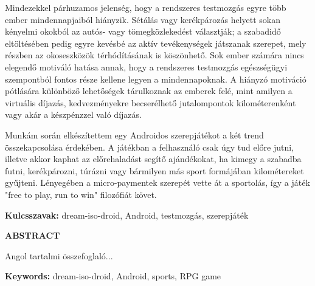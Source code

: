 \documentclass[a4paper,oneside,10pt]{report}
\begin{document}
Mindezekkel párhuzamos jelenség, hogy a rendszeres testmozgás egyre több ember mindennapjaiból hiányzik.
Sétálás vagy kerékpározás helyett sokan kényelmi okokból az autós- vagy tömegközlekedést választják; a szabadidő eltöltésében pedig egyre kevésbé az aktív tevékenységek játszanak szerepet, mely részben az okoseszközök térhódításának is köszönhető.
Sok ember számára nincs elegendő motiváló hatása annak, hogy a rendszeres testmozgás egészségügyi szempontból fontos része kellene legyen a mindennapoknak. 
A hiányzó motiváció pótlására különböző lehetőségek tárulkoznak az emberek felé, mint amilyen a virtuális díjazás, kedvezményekre becserélhető jutalompontok kilométerenként vagy akár a készpénzzel való díjazás. 

Munkám során elkészítettem egy Androidos szerepjátékot a két trend összekapcsolása érdekében. 
A játékban a felhasználó csak úgy tud előre jutni, illetve akkor kaphat az előrehaladást segítő ajándékokat, ha kimegy a szabadba futni, kerékpározni, túrázni vagy bármilyen más sport formájában kilométereket gyűjteni. 
Lényegében a micro-paymentek szerepét vette át a sportolás, így a játék "free to play, run to win" filozófiát követ.

\textbf{Kulcsszavak:} dream-iso-droid, Android, testmozgás, szerepjáték

\newpage

\Large
\begin{center}
	\textbf{ABSTRACT}
\end{center}
\normalsize
\noindent
Angol tartalmi összefoglaló...

\textbf{Keywords:} dream-iso-droid, Android, sports, RPG game
\tableofcontents
\newpage
\listoffigures
\newpage






\pagestyle{plain} %
\end{document}
